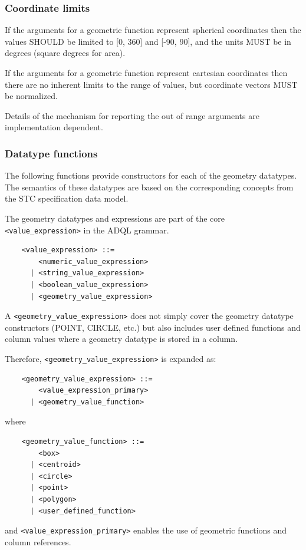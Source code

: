 \documentclass[11pt,a4paper]{ivoa}
\newcommand{\STCspec}{STC specification\xspace}
\begin{document}
\subsubsection{Coordinate limits}
\label{sec:functions.geom.limits}

If the arguments for a geometric function represent spherical coordinates
then the values SHOULD be limited to [0, 360] and [-90, 90],
and the units MUST be in degrees (square degrees for area).
            
If the arguments for a geometric function represent cartesian coordinates
then there are no inherent limits to the range of values, but
coordinate vectors MUST be normalized.

Details of the mechanism for reporting the out of range arguments are
implementation dependent.

\subsubsection{Datatype functions}
\label{sec:functions.geom.type}

The following functions provide constructors for each of the geometry datatypes.
The semantics of these datatypes are based on the corresponding
concepts from the \STCspec data model.

The geometry datatypes and expressions are part of the core \verb:<value_expression>:
in the ADQL grammar.

\begin{verbatim}
    <value_expression> ::=
        <numeric_value_expression>
      | <string_value_expression>
      | <boolean_value_expression>
      | <geometry_value_expression>
\end{verbatim}

A \verb:<geometry_value_expression>: does not simply cover the geometry datatype
constructors (POINT, CIRCLE, etc.) but also includes user defined functions and
column values where a geometry datatype is stored in a column.

Therefore, \verb:<geometry_value_expression>: is expanded as:
\begin{verbatim}
    <geometry_value_expression> ::= 
        <value_expression_primary>
      | <geometry_value_function>
\end{verbatim}
\noindent
where
\begin{verbatim}
    <geometry_value_function> ::=
        <box>
      | <centroid>
      | <circle>
      | <point>
      | <polygon>
      | <user_defined_function>
\end{verbatim}
and \verb:<value_expression_primary>: enables the use of geometric functions
and column references.
\end{document}
